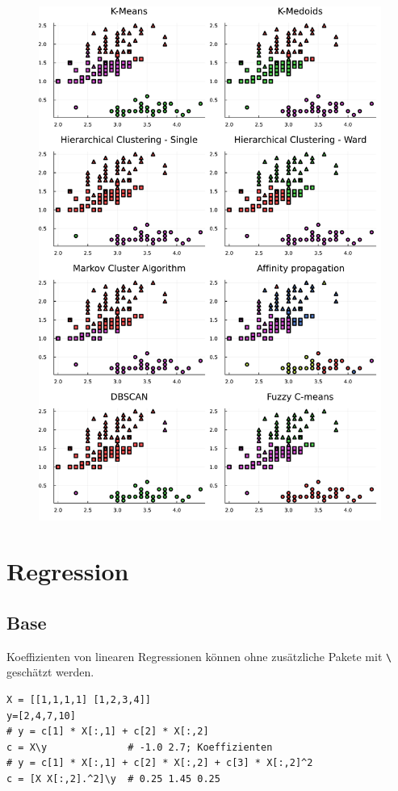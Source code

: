 \documentclass[10pt,twocolumn]{scrartcl}
\begin{document}
\begin{figure}[h]
  \centering
  \includegraphics[width=.95\columnwidth]{cluster.pdf}
\end{figure}


\section{Regression}

\subsection{Base}

Koeffizienten von linearen Regressionen können ohne zusätzliche Pakete mit
\lstinline|\| geschätzt werden.

\begin{lstlisting}
X = [[1,1,1,1] [1,2,3,4]]
y=[2,4,7,10]
# y = c[1] * X[:,1] + c[2] * X[:,2]
c = X\y              # -1.0 2.7; Koeffizienten
# y = c[1] * X[:,1] + c[2] * X[:,2] + c[3] * X[:,2]^2
c = [X X[:,2].^2]\y  # 0.25 1.45 0.25
\end{lstlisting}
\end{document}
